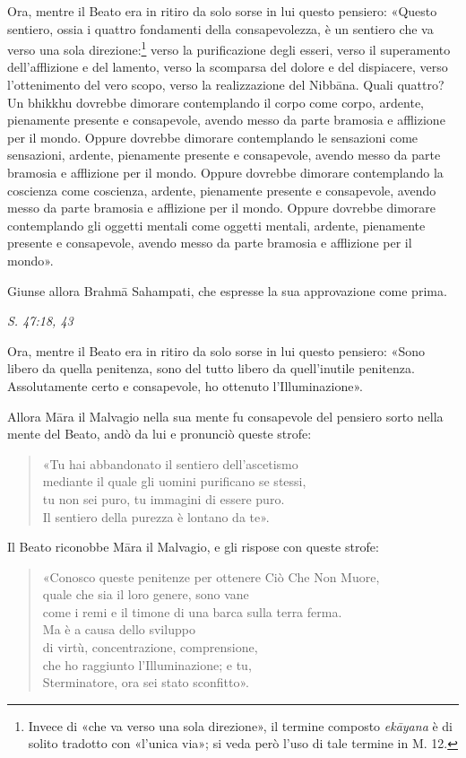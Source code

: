 Ora, mentre il Beato era in ritiro da solo sorse in lui questo pensiero:
«Questo sentiero, ossia i quattro fondamenti della consapevolezza, è un
sentiero che va verso una sola direzione:\footnote{Invece di «che va verso una sola direzione», il termine composto \emph{ekāyana} è di solito tradotto con «l’unica via»; si veda però l’uso di tale termine in M. 12.} verso la
purificazione degli esseri, verso il superamento dell’afflizione e del
lamento, verso la scomparsa del dolore e del dispiacere, verso
l’ottenimento del vero scopo, verso la realizzazione del Nibbāna. Quali
quattro? Un bhikkhu dovrebbe dimorare contemplando il corpo come corpo,
ardente, pienamente presente e consapevole, avendo messo da parte
bramosia e afflizione per il mondo. Oppure dovrebbe dimorare
contemplando le sensazioni come sensazioni, ardente, pienamente presente
e consapevole, avendo messo da parte bramosia e afflizione per il mondo.
Oppure dovrebbe dimorare contemplando la coscienza come coscienza,
ardente, pienamente presente e consapevole, avendo messo da parte
bramosia e afflizione per il mondo. Oppure dovrebbe dimorare
contemplando gli oggetti mentali come oggetti mentali, ardente,
pienamente presente e consapevole, avendo messo da parte bramosia e
afflizione per il mondo».


Giunse allora Brahmā Sahampati, che espresse la sua approvazione come
prima.


\emph{S. 47:18, 43}


Ora, mentre il Beato era in ritiro da solo sorse in lui questo pensiero:
«Sono libero da quella penitenza, sono del tutto libero da quell’inutile
penitenza. Assolutamente certo e consapevole, ho ottenuto
l’Illuminazione».


Allora Māra il Malvagio nella sua mente fu consapevole del pensiero
sorto nella mente del Beato, andò da lui e pronunciò queste strofe:


\begin{quotation}
«Tu hai abbandonato il sentiero dell’ascetismo \\
mediante il quale gli uomini purificano se stessi, \\
tu non sei puro, tu immagini di essere puro. \\
Il sentiero della purezza è lontano da te».
\end{quotation}

Il Beato riconobbe Māra il Malvagio, e gli rispose con queste strofe:


\begin{quotation}
«Conosco queste penitenze per ottenere Ciò Che Non Muore, \\
quale che sia il loro genere, sono vane \\
come i remi e il timone di una barca sulla terra ferma. \\
Ma è a causa dello sviluppo \\
di virtù, concentrazione, comprensione, \\
che ho raggiunto l’Illuminazione; e tu, \\
Sterminatore, ora sei stato sconfitto».
\end{quotation}


